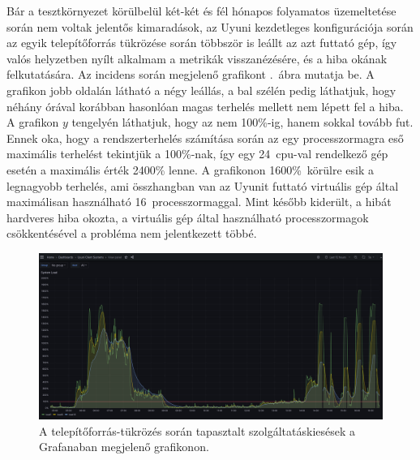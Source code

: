 Bár a tesztkörnyezet körülbelül két-két és fél hónapos folyamatos üzemeltetése során nem voltak jelentős kimaradások, az Uyuni kezdetleges konfigurációja során az egyik telepítőforrás tükrözése során többször is leállt az azt futtató gép, így valós helyzetben nyílt alkalmam a metrikák visszanézésére, és a hiba okának felkutatására. Az incidens során megjelenő grafikont .~ábra mutatja be. A grafikon jobb oldalán látható a négy leállás, a bal szélén pedig láthatjuk, hogy néhány órával korábban hasonlóan magas terhelés mellett nem lépett fel a hiba. A grafikon $ y $ tengelyén láthatjuk, hogy az nem 100\%-ig, hanem sokkal tovább fut. Ennek oka, hogy a rendszerterhelés számítása során az egy processzormagra eső maximális terhelést tekintjük a 100\%-nak, így egy 24~\acrshort{cpu}-val rendelkező gép esetén a maximális érték 2400\% lenne. A grafikonon 1600\%~körülre esik a legnagyobb terhelés, ami összhangban van az Uyunit futtató virtuális gép által maximálisan használható 16~processzormaggal. Mint később kiderült, a hibát hardveres hiba okozta, a virtuális gép által használható processzormagok csökkentésével a probléma nem jelentkezett többé.

\begin{figure}[ht]
	\centering
	\includegraphics[width=15cm]{figures/reboot-grafana.png}
	\caption{A telepítőforrás-tükrözés során tapasztalt szolgáltatáskiesések a Grafanaban megjelenő grafikonon.}
	\label{fig:reboot-grafana}
\end{figure}
